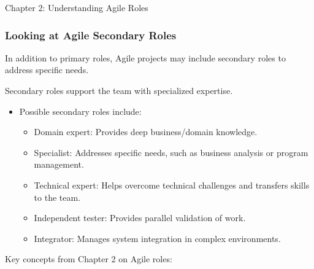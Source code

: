 \begin{notes}{Chapter 2: Understanding Agile Roles}
\begin{highlight}
    \end{highlight}
    
    \subsubsection*{Looking at Agile Secondary Roles}
    
    In addition to primary roles, Agile projects may include secondary roles to address specific needs.
    
    \begin{highlight}
    
        Secondary roles support the team with specialized expertise.
        
        \begin{itemize}
            \item Possible secondary roles include:
            \begin{itemize}
                \item Domain expert: Provides deep business/domain knowledge.
                \item Specialist: Addresses specific needs, such as business analysis or program management.
                \item Technical expert: Helps overcome technical challenges and transfers skills to the team.
                \item Independent tester: Provides parallel validation of work.
                \item Integrator: Manages system integration in complex environments.
            \end{itemize}
        \end{itemize}
    
    \end{highlight}
    
    \begin{highlight}
    
        Key concepts from Chapter 2 on Agile roles:
        

\end{highlight}
\end{notes}
